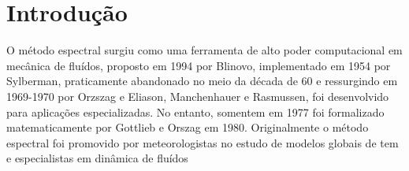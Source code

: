 \chapter{Introdução}
\label{cap:introducao}

O método espectral surgiu como uma ferramenta de alto poder computacional em mecânica de fluídos, proposto em 1994 por Blinovo, implementado em 1954 por Sylberman, praticamente abandonado no meio da década de 60 e ressurgindo em 1969-1970 por Orzszag e Eliason, Manchenhauer e Rasmussen, foi desenvolvido para aplicações especializadas. No entanto, somentem em 1977 foi formalizado matematicamente por Gottlieb e Orszag em 1980.
Originalmente o método espectral foi promovido por meteorologistas no estudo de modelos globais de tem e especialistas em dinâmica de fluídos
%
%
%




